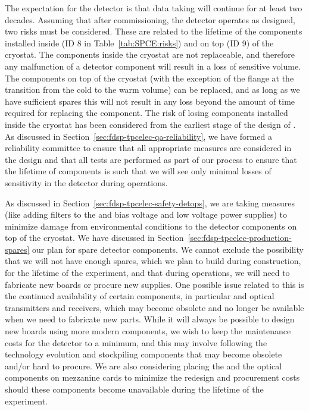 The expectation for the  detector is that data taking will continue
for at least two decades. Assuming that after commissioning, the
detector operates as designed, two risks must be considered.
These are related to the lifetime of the  components
installed inside (ID 8 in Table~\ref{tab:SPCE:risks}) and on top (ID 9)
of the cryostat. The components inside the cryostat are not replaceable,
and therefore any malfunction of a detector component will result in
a loss of sensitive volume. The components on top of the cryostat
(with the exception of the flange at the transition from the cold to
the warm volume) can be replaced, and as long as we have sufficient
spares this will not result in any loss beyond the amount 
of time required for replacing the component. The risk of losing components installed inside the cryostat has been considered
from the earliest stage of the design of . As discussed
in Section~\ref{sec:fdsp-tpcelec-qa-reliability}, we have formed a 
reliability committee to ensure that all appropriate measures
are considered in the design and that all tests are performed
as part of our  process to ensure that the lifetime of components is
such that we will see only minimal losses of sensitivity in the 
detector during operations. 

As discussed in Section~\ref{sec:fdsp-tpcelec-safety-detops}, we
are taking measures (like adding  filters to the
 and bias voltage and low voltage power supplies) to
minimize damage from environmental conditions to the 
detector components on top of the cryostat. We have discussed in
Section~\ref{sec:fdsp-tpcelec-production-spares} our plan for 
spare detector components. We cannot exclude the possibility that we will not have enough
spares, which we plan to build during construction, for the lifetime of the experiment, and that during 
operations, we will need to fabricate new boards or procure new
supplies. One possible issue related to this is the 
continued availability of certain components, in particular
 and optical transmitters and receivers, which may 
become obsolete and no longer be available when we need to fabricate new
parts. While it will always be 
possible to design new boards using more modern components, we
wish to keep the maintenance costs for the detector to a minimum,
and this may involve following the technology evolution and stockpiling components that may become obsolete
and/or hard to procure. We are also considering placing the
 and the optical components on mezzanine cards
to minimize the redesign and procurement costs should these 
components become unavailable during the lifetime of the experiment.
